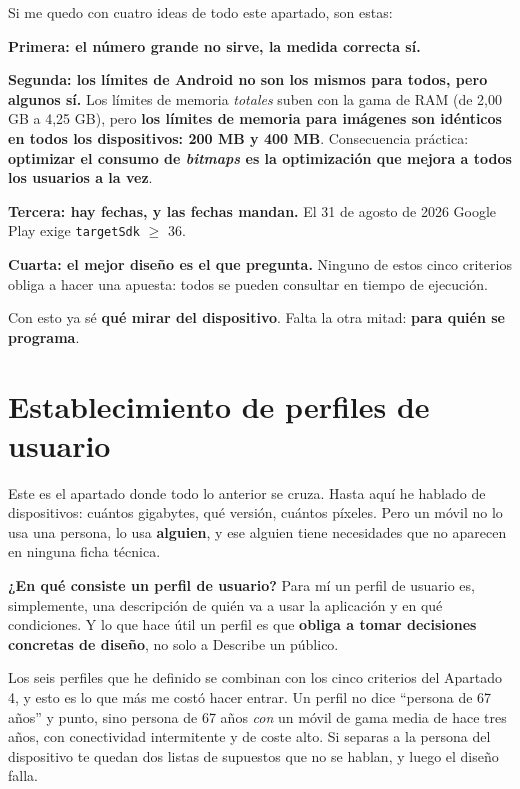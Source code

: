 \documentclass[11pt,a4paper]{article}
\newcommand{\code}[1]{\texttt{\color{primary}#1}}
\newcommand{\campo}[1]{\textbf{\color{primary}#1}}
\begin{document}
	Si me quedo con cuatro ideas de todo este apartado, son estas:
	
	\textbf{Primera: el número grande no sirve, la medida correcta sí.}
	
	\textbf{Segunda: los límites de Android no son los mismos para todos, pero algunos sí.} Los límites de memoria \emph{totales} suben con la gama de RAM (de 2,00 GB a 4,25 GB), pero \textbf{los límites de memoria para imágenes son idénticos en todos los dispositivos: 200 MB y 400 MB}. Consecuencia práctica: \textbf{optimizar el consumo de \emph{bitmaps} es la optimización que mejora a todos los usuarios a la vez}.
	
	\textbf{Tercera: hay fechas, y las fechas mandan.} El 31 de agosto de 2026 Google Play exige \code{targetSdk} $\geq$ 36.
	
	\textbf{Cuarta: el mejor diseño es el que pregunta.} Ninguno de estos cinco criterios obliga a hacer una apuesta: todos se pueden consultar en tiempo de ejecución.
	
	Con esto ya sé \textbf{qué mirar del dispositivo}. Falta la otra mitad: \textbf{para quién se programa}.
	
	\newpage
	\section{Establecimiento de perfiles de usuario}
	
	Este es el apartado donde todo lo anterior se cruza. Hasta aquí he hablado de dispositivos: cuántos gigabytes, qué versión, cuántos píxeles. Pero un móvil no lo usa una persona, lo usa \textbf{alguien}, y ese alguien tiene necesidades que no aparecen en ninguna ficha técnica.
	
	\campo{¿En qué consiste un perfil de usuario?}
	Para mí un perfil de usuario es, simplemente, una descripción de quién va a usar la aplicación y en qué condiciones. Y lo que hace útil un perfil es que \textbf{obliga a tomar decisiones concretas de diseño}, no solo a Describe un público.
	
	Los seis perfiles que he definido se combinan con los cinco criterios del Apartado 4, y esto es lo que más me costó hacer entrar. Un perfil no dice \enquote{persona de 67 años} y punto, sino persona de 67 años \emph{con} un móvil de gama media de hace tres años, con conectividad intermitente y de coste alto. Si separas a la persona del dispositivo te quedan dos listas de supuestos que no se hablan, y luego el diseño falla.
	
\end{document}
